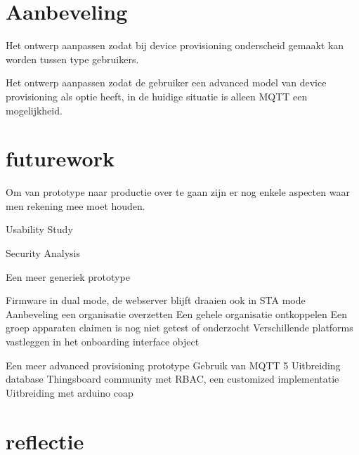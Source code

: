 		
		
		\chapter{Aanbeveling}
		
		
		Het ontwerp aanpassen zodat bij device provisioning onderscheid gemaakt kan worden tussen type gebruikers.
		
		
		Het ontwerp aanpassen zodat de gebruiker een advanced model van device provisioning als optie heeft, in de huidige situatie is alleen MQTT een mogelijkheid.
		
		
		\begin{center}
		\end{center}
		
		\chapter{futurework}
		
		Om van prototype naar productie over te gaan zijn er nog enkele aspecten waar men rekening mee moet houden.
		
		Usability Study 
		
		
		Security Analysis 
		
		Een meer generiek prototype
		
		
		Firmware in dual mode, de webserver blijft draaien ook in STA mode
		Aanbeveling een organisatie overzetten 
		Een gehele organisatie ontkoppelen 
		Een groep apparaten claimen is nog niet getest of onderzocht
		Verschillende platforms vastleggen in het onboarding interface object
		
		Een meer advanced provisioning prototype 
		Gebruik van MQTT 5 
		Uitbreiding database Thingsboard community met RBAC, een customized implementatie
		Uitbreiding met arduino coap
		
		
		
		
		\begin{center}
		\end{center}
		\chapter{reflectie}
		
		
		
